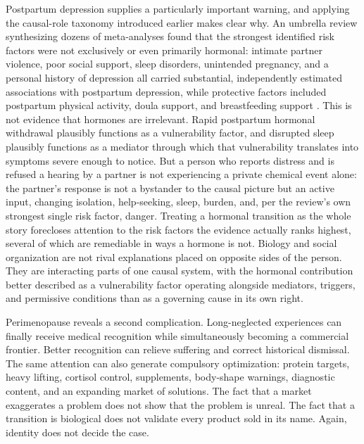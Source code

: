 \documentclass[11pt]{article}
\begin{document}
Postpartum depression supplies a particularly important warning, and applying the causal-role taxonomy introduced earlier makes clear why. An umbrella review synthesizing dozens of meta-analyses found that the strongest identified risk factors were not exclusively or even primarily hormonal: intimate partner violence, poor social support, sleep disorders, unintended pregnancy, and a personal history of depression all carried substantial, independently estimated associations with postpartum depression, while protective factors included postpartum physical activity, doula support, and breastfeeding support \citep{xu2026postpartum}. This is not evidence that hormones are irrelevant. Rapid postpartum hormonal withdrawal plausibly functions as a vulnerability factor, and disrupted sleep plausibly functions as a mediator through which that vulnerability translates into symptoms severe enough to notice. But a person who reports distress and is refused a hearing by a partner is not experiencing a private chemical event alone: the partner's response is not a bystander to the causal picture but an active input, changing isolation, help-seeking, sleep, burden, and, per the review's own strongest single risk factor, danger. Treating a hormonal transition as the whole story forecloses attention to the risk factors the evidence actually ranks highest, several of which are remediable in ways a hormone is not. Biology and social organization are not rival explanations placed on opposite sides of the person. They are interacting parts of one causal system, with the hormonal contribution better described as a vulnerability factor operating alongside mediators, triggers, and permissive conditions than as a governing cause in its own right.

Perimenopause reveals a second complication. Long-neglected experiences can finally receive medical recognition while simultaneously becoming a commercial frontier. Better recognition can relieve suffering and correct historical dismissal. The same attention can also generate compulsory optimization: protein targets, heavy lifting, cortisol control, supplements, body-shape warnings, diagnostic content, and an expanding market of solutions. The fact that a market exaggerates a problem does not show that the problem is unreal. The fact that a transition is biological does not validate every product sold in its name. Again, identity does not decide the case.
\end{document}
